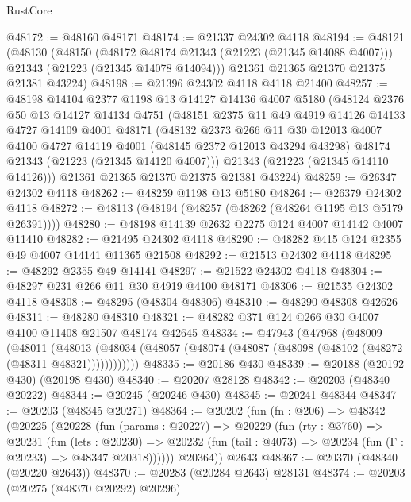 \begin{lexlean}{RustCore}
\begin{coremodule}
@48172 := @48160 @48171
@48174 := @21337 @24302 @4118
@48194 := @48121
    (@48130
      (@48150
        (@48172 @48174 @21343 (@21223 (@21345 @14088 @4007)))
        @21343
        (@21223 (@21345 @14078 @14094)))
      @21361
      @21365
      @21370
      @21375
      @21381
      @43224)
@48198 := @21396 @24302 @4118 @4118 @21400
@48257 := @48198
    @14104
    @2377
    @1198
    @13
    @14127
    @14136
    @4007
    @5180
    (@48124
      @2376
      @50
      @13
      @14127
      @14134
      @4751
      (@48151
        @2375
        @11
        @49
        @4919
        @14126
        @14133
        @4727
        @14109
        @4001
        @48171
        (@48132
          @2373
          @266
          @11
          @30
          @12013
          @4007
          @4100
          @4727
          @14119
          @4001
          (@48145 @2372 @12013 @43294 @43298)
          @48174
          @21343
          (@21223 (@21345 @14120 @4007)))
        @21343
        (@21223 (@21345 @14110 @14126)))
      @21361
      @21365
      @21370
      @21375
      @21381
      @43224)
@48259 := @26347 @24302 @4118
@48262 := @48259 @1198 @13 @5180
@48264 := @26379 @24302 @4118
@48272 := @48113 (@48194 (@48257 (@48262 (@48264 @1195 @13 @5179 @26391))))
@48280 := @48198 @14139 @2632 @2275 @124 @4007 @14142 @4007 @11410
@48282 := @21495 @24302 @4118
@48290 := @48282 @415 @124 @2355 @49 @4007 @14141 @11365 @21508
@48292 := @21513 @24302 @4118
@48295 := @48292 @2355 @49 @14141
@48297 := @21522 @24302 @4118
@48304 := @48297 @231 @266 @11 @30 @4919 @4100 @48171
@48306 := @21535 @24302 @4118
@48308 := @48295 (@48304 @48306)
@48310 := @48290 @48308 @42626
@48311 := @48280 @48310
@48321 := @48282 @371 @124 @266 @30 @4007 @4100 @11408 @21507 @48174 @42645
@48334 := @47943
    (@47968
      (@48009
        (@48011
          (@48013 (@48034 (@48057 (@48074 (@48087 (@48098 (@48102 (@48272 (@48311 @48321))))))))))))
@48335 := @20186 @430
@48339 := @20188 (@20192 @430) (@20198 @430)
@48340 := @20207 @28128
@48342 := @20203 (@48340 @20222)
@48344 := @20245 (@20246 @430)
@48345 := @20241 @48344
@48347 := @20203 (@48345 @20271)
@48364 := @20202
    (fun (fn : @206) =>
    @48342
      (@20225
        (@20228
          (fun (params : @20227) =>
          @20229
            (fun (rty : @3760) =>
            @20231
              (fun (lets : @20230) =>
              @20232 (fun (tail : @4073) => @20234 (fun (Γ : @20233) => @48347 @20318))))))
        @20364))
    @2643
@48367 := @20370 (@48340 (@20220 @2643))
@48370 := @20283 (@20284 @2643) @28131
@48374 := @20203 (@20275 (@48370 @20292) @20296)

\end{coremodule}
\end{lexlean}
